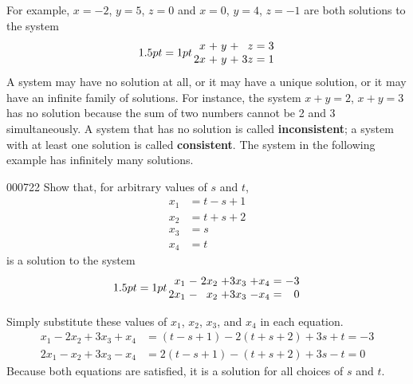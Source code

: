 For example, $x = -2$, $y = 5$, $z = 0$ and $x = 0$, $y = 4$, $z = -1$ are both solutions to the system
\begin{equation*}
\arraycolsep=1pt
\begin{array}{rrrrrrr}
 	 x & + & y & + &  z & = & 3\\
	2x & + & y & + & 3z & = & 1
\end{array}
\end{equation*}
A system may have no solution at all, or it may have a unique solution, or it may have an infinite family of solutions. For instance, the system $x + y = 2$, $x + y = 3$ has no solution because the sum of two numbers cannot be 2 and 3 simultaneously. A system that has no solution is called \textbf{inconsistent}; a system with at least one solution is called \textbf{consistent}. The system in the following example has infinitely many solutions.

\begin{example}{}{000722}
Show that, for arbitrary values of $s$ and $t$,
\begin{align*}
	x_1 &= t - s + 1 \\
	x_2 &= t + s + 2 \\
	x_3 &= s\\
	x_4 &= t
\end{align*}
is a solution to the system
\begin{equation*}
\arraycolsep=1pt
\begin{array}{rrrrrrr}
	x_1 & - & 2x_2 & + 3x_3 & + x_4 & = & -3\\
	2x_1 & -&  x_2 & + 3x_3 & - x_4 & = & 0
\end{array}
\end{equation*}
\begin{solution}
Simply substitute these values of $x_1$, $x_2$, $x_3$, and $x_4$ in each equation.
\begin{align*}
	x_1 - 2x_2 + 3x_3 + x_4 &= (t - s + 1) - 2(t + s + 2) + 3s + t = -3\\
	2x_1 - x_2 + 3x_3 - x_4 &= 2(t - s + 1) - (t + s + 2) + 3s - t = 0
\end{align*}
Because both equations are satisfied, it is a solution for all choices of $s$ and $t$.
\end{solution}
\end{example}

